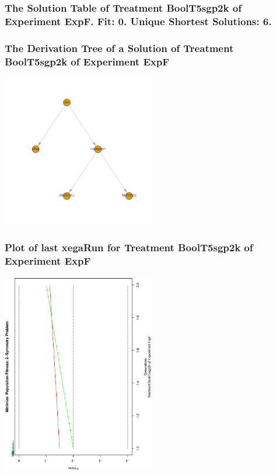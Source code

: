 \documentclass[18pt,c]{beamer}
\begin{document}
 \begin{frame}
 \fontsize{8pt}{9pt}\selectfont
 \frametitle{ The Solution Table of Treatment BoolT5sgp2k of Experiment ExpF. Fit: 0. Unique Shortest Solutions: 6. }

 \label{ExpFSolutionTable003.tex}  
 \end{frame}

 \begin{frame}
 \frametitle{ The Derivation Tree of a Solution of Treatment BoolT5sgp2k of Experiment ExpF }
 \begin{center}
\includegraphics[width=0.5\textwidth, angle=0]
{ExpFDerivationTreeFigure003.pdf}
 \end{center}
 \label{report/ExpFDerivationTreeFigure003.pdf}  
 \end{frame}

 \begin{frame}
 \frametitle{ Plot of last xegaRun for Treatment BoolT5sgp2k of Experiment ExpF }
 \begin{center}
\includegraphics[width=0.5\textwidth, angle=-90]
{ExpFPlotPopStatsFigure003.eps}
 \end{center}
 \label{report/ExpFPlotPopStatsFigure003.eps}  
 \end{frame}
\end{document}
